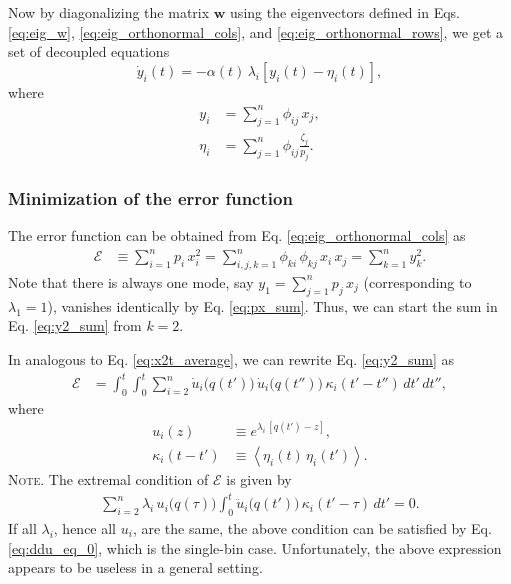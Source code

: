 \documentclass[reprint]{revtex4-1}
\newcommand{\note}[1]{{\color{DarkGreen}\footnotesize \textsc{Note.} #1}}
\begin{document}
Now by diagonalizing the matrix $\mathbf w$
using the eigenvectors defined in Eqs. \eqref{eq:eig_w},
\eqref{eq:eig_orthonormal_cols},
and
\eqref{eq:eig_orthonormal_rows},
we get a set of decoupled equations
%
\begin{equation}
\dot y_i(t)
=
-\alpha(t) \, \lambda_i
[y_i(t) - \eta_i(t)],
\label{eq:yt_diffeq}
\end{equation}
%
where
\begin{align}
  y_i &= \sum_{j=1}^n \phi_{ij} \, x_j,
  \label{eq:y_def}
  \\
  \eta_i &= \sum_{j=1}^n \phi_{ij} \frac{ \zeta_j}{ p_j}.
  \label{eq:eta_def}
\end{align}



\subsubsection{Minimization of the error function}



The error function can be obtained
from Eq. \eqref{eq:eig_orthonormal_cols}
as
\begin{align}
  \mathcal E
  &\equiv
  \sum_{i = 1}^n p_i \, x_i^2
  =
  \sum_{i, j, k=1}^n \phi_{ki} \, \phi_{kj} \, x_i \, x_j
  =
  \sum_{k = 1}^n y_k^2.
  \label{eq:y2_sum}
\end{align}
%
Note that there is always one mode, say
$y_1 = \sum_{j=1}^n p_j \, x_j$
(corresponding to $\lambda_1 = 1$),
vanishes identically by Eq. \eqref{eq:px_sum}.
%
Thus, we can start the sum in Eq. \eqref{eq:y2_sum}
from $k = 2$.



In analogous to Eq. \eqref{eq:x2t_average},
we can rewrite Eq. \eqref{eq:y2_sum} as
%
\begin{align}
  \mathcal E
  &=
  \int_0^t \int_0^t
  \sum_{i = 2}^n
  \dot u_i\bigl( q(t') \bigr) \,
  \dot u_i\bigl( q(t'') \bigr) \,
  \kappa_i(t' - t'') \, dt' \, dt'',
  \label{eq:error_mbin}
\end{align}
%
where
\begin{align*}
  u_i(z)
  &\equiv
  e^{\lambda_i \, [q(t') - z]},
  \\
  \kappa_i(t - t')
  &\equiv
  \left\langle
    \eta_i(t) \, \eta_i(t')
  \right\rangle.
\end{align*}
%
\note{The extremal condition of $\mathcal E$ is given by
%
\begin{align}
\sum_{i=2}^n
\lambda_i \, u_i\bigl( q(\tau) \bigr)
\int_0^t
\ddot u_i\bigl( q(t') \bigr) \, \kappa_i(t' - \tau) \, dt' = 0.
\label{eq:optimal_mbin}
\end{align}
%
If all $\lambda_i$, hence all $u_i$, are the same,
the above condition can be satisfied
by Eq. \eqref{eq:ddu_eq_0},
which is the single-bin case.
%
Unfortunately, the above expression
appears to be useless in a general setting.
}
\end{document}
